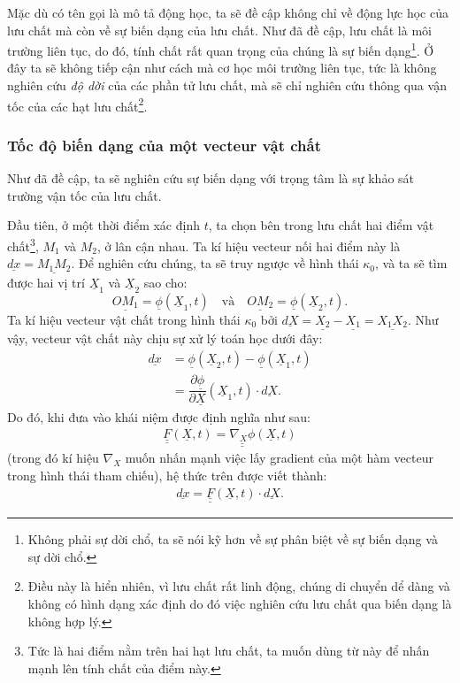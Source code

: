 \documentclass[../../../main.tex]{subfiles}
\begin{document}
    Mặc dù có tên gọi là mô tả động học, ta sẽ đề cập không chỉ về động lực học của lưu chất mà còn về sự biến dạng của lưu chất. Như đã đề cập, lưu chất là môi trường liên tục, do đó, tính chất rất quan trọng của chúng là sự biến dạng\footnote{Không phải sự dời chổ, ta sẽ nói kỹ hơn về sự phân biệt về sự biến dạng và sự dời chổ.}. Ở đây ta sẽ không tiếp cận như cách mà cơ học môi trường liên tục, tức là không nghiên cứu \emph{độ dời} của các phần tử lưu chất, mà sẽ chỉ nghiên cứu thông qua vận tốc của các hạt lưu chất\footnote{Điều này là hiển nhiên, vì lưu chất rất linh động, chúng di chuyển dể dàng và không có hình dạng xác định do đó việc nghiên cứu lưu chất qua biến dạng là không hợp lý.}.
\subsubsection{Tốc độ biến dạng của một vecteur vật chất}
    Như đã đề cập, ta sẽ nghiên cứu sự biến dạng với trọng tâm là sự khảo sát trường vận tốc của lưu chất.

    Đầu tiên, ở một thời điểm xác định $t$, ta chọn bên trong lưu chất hai điểm vật chất\footnote{Tức là hai điểm nằm trên hai hạt lưu chất, ta muốn dùng từ này để nhấn mạnh lên tính chất của điểm này.}, $M_1$ và $M_2$, ở lân cận nhau. Ta kí hiệu vecteur nối hai điểm này là $\underline{dx}=\underline{M_1M_2}$. Để nghiên cứu chúng, ta sẽ truy ngược về hình thái $\kappa_0$, và ta sẽ tìm được hai vị trí $\underline{X}_1$ và $\underline{X}_2$ sao cho:
		\[
			\underline{OM_1}=\underline{\phi}\left(\underline{X}_1,t\right)\quad\text{và}\quad\underline{OM_2}=\underline{\phi}\left(\underline{X}_2,t\right).
		\]
	Ta kí hiệu vecteur vật chất trong hình thái $\kappa_0$ bởi $\underline{dX}=\underline{X_2}-\underline{X_1}=\underline{X_1X_2}$. Như vậy, vecteur vật chất này chịu sự xử lý toán học dưới đây:
		\[
			\begin{aligned}
				\underline{dx}&=\underline{\phi}\left(\underline{X}_2,t\right)-\underline{\phi}\left(\underline{X}_1,t\right)\\
				&=\dfrac{\partial\underline{\phi}}{\partial\underline{X}}\left(\underline{X}_1,t\right)\cdot\underline{dX}.
			\end{aligned}
		\]
	Do đó, khi đưa vào khái niệm  được định nghĩa như sau:
		\begin{align}
			\boxed{\underline{\underline{F}}\left(\underline{X},t\right)=\underline{\underline{\nabla_X\phi}}\left(\underline{X},t\right)}
		\end{align}
	(trong đó kí hiệu $\nabla_X$ muốn nhấn mạnh việc lấy gradient của một hàm vecteur trong hình thái tham chiếu), hệ thức trên được viết thành:
		\begin{align}
			\underline{dx}=\underline{\underline{F}}\left(\underline{X},t\right)\cdot\underline{dX}.
		\end{align}
\end{document}
